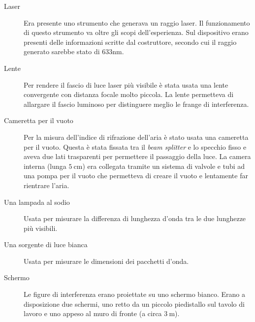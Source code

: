 \documentclass[a4paper,11pt]{article}
\begin{document}
\begin{description}
	
	\item[Laser] Era presente uno strumento che generava un raggio laser. Il funzionamento di questo strumento va oltre gli scopi dell'esperienza. Sul dispositivo erano presenti delle informazioni scritte dal costruttore, secondo cui il raggio generato sarebbe stato di $ 633\si{\nano\meter} $.
	\item[Lente] Per rendere il fascio di luce laser più visibile è stata usata una lente convergente con distanza focale molto piccola. La lente permetteva di allargare il fascio luminoso per distinguere meglio le frange di interferenza.
	\item[Cameretta per il vuoto] Per la misura dell'indice di rifrazione dell'aria è stato usata una cameretta per il vuoto. Questa è stata fissata tra il \emph{beam splitter} e lo specchio fisso e aveva due lati trasparenti per permettere il passaggio della luce. La camera interna (lunga $ \SI{5}{\centi\meter}$) era collegata tramite un sistema di valvole e tubi ad una pompa per il vuoto che permetteva di creare il vuoto e lentamente far rientrare l'aria.
	\item[Una lampada al sodio] Usata per misurare la differenza di lunghezza d'onda tra le due lunghezze più visibili.
	\item[Una sorgente di luce bianca] Usata per misurare le dimensioni dei pacchetti d'onda.
	\item[Schermo] Le figure di interferenza erano proiettate su uno schermo bianco. Erano a disposizione due schermi, uno retto da un piccolo piedistallo sul tavolo di lavoro e uno appeso al muro di fronte (a circa $ \SI{3}{\meter} $).
\end{description}
\end{document}
